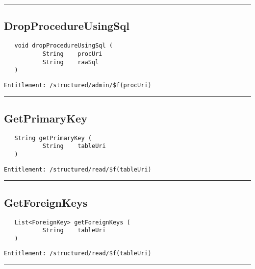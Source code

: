 \rule{12cm}{2pt}
\subsection{DropProcedureUsingSql}
\label{Api:DropProcedureUsingSql}
\begin{Verbatim}
   void dropProcedureUsingSql (
           String    procUri
           String    rawSql
   )
\end{Verbatim}
\begin{Verbatim}[formatcom=\color{Maroon}]
  Entitlement: /structured/admin/$f(procUri)
\end{Verbatim}



\rule{12cm}{2pt}
\subsection{GetPrimaryKey}
\label{Api:GetPrimaryKey}
\begin{Verbatim}
   String getPrimaryKey (
           String    tableUri
   )
\end{Verbatim}
\begin{Verbatim}[formatcom=\color{Maroon}]
  Entitlement: /structured/read/$f(tableUri)
\end{Verbatim}



\rule{12cm}{2pt}
\subsection{GetForeignKeys}
\label{Api:GetForeignKeys}
\begin{Verbatim}
   List<ForeignKey> getForeignKeys (
           String    tableUri
   )
\end{Verbatim}
\begin{Verbatim}[formatcom=\color{Maroon}]
  Entitlement: /structured/read/$f(tableUri)
\end{Verbatim}



\rule{12cm}{2pt}
